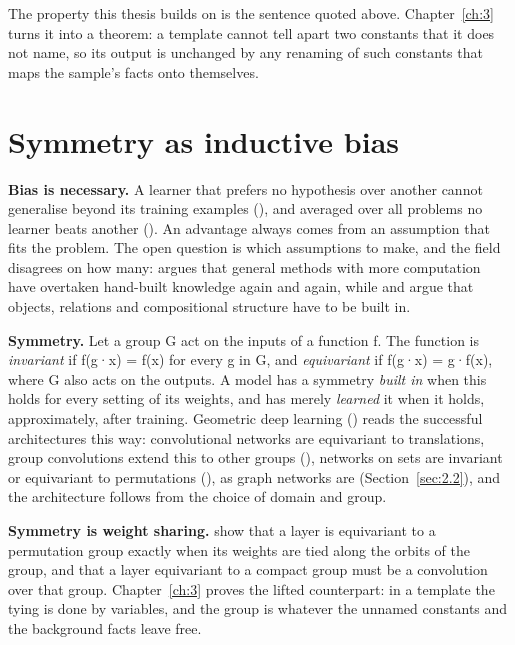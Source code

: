 The property this thesis builds on is the sentence quoted above. Chapter~\ref{ch:3} turns it into a theorem: a template cannot tell apart two constants that it does not name, so its output is unchanged by any renaming of such constants that maps the sample's facts onto themselves.

\section{Symmetry as inductive bias}\label{sec:2.4}

\textbf{Bias is necessary.} A learner that prefers no hypothesis over another cannot generalise beyond its training examples (\citealp{mitchell1980need}), and averaged over all problems no learner beats another (\citealp{wolpert1996lack}). An advantage always comes from an assumption that fits the problem. The open question is which assumptions to make, and the field disagrees on how many: \citet{sutton2019bitter} argues that general methods with more computation have overtaken hand-built knowledge again and again, while \citet{marcus2018deep} and \citet{lake2017building} argue that objects, relations and compositional structure have to be built in.

\textbf{Symmetry.} Let a group G act on the inputs of a function f. The function is \emph{invariant} if f(g·x) = f(x) for every g in G, and \emph{equivariant} if f(g·x) = g·f(x), where G also acts on the outputs. A model has a symmetry \emph{built in} when this holds for every setting of its weights, and has merely \emph{learned} it when it holds, approximately, after training. Geometric deep learning (\citealp{bronstein2021geometric}) reads the successful architectures this way: convolutional networks are equivariant to translations, group convolutions extend this to other groups (\citealp{cohen2016group}), networks on sets are invariant or equivariant to permutations (\citealp{zaheer2017deep}), as graph networks are (Section~\ref{sec:2.2}), and the architecture follows from the choice of domain and group.

\textbf{Symmetry is weight sharing.} \citet{ravanbakhsh2017equivariance} show that a layer is equivariant to a permutation group exactly when its weights are tied along the orbits of the group, and \citet{kondor2018generalization} that a layer equivariant to a compact group must be a convolution over that group. Chapter~\ref{ch:3} proves the lifted counterpart: in a template the tying is done by variables, and the group is whatever the unnamed constants and the background facts leave free.

